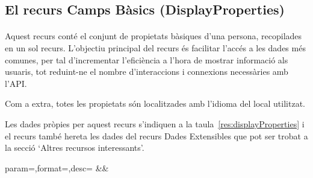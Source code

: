 \subsection{El recurs Camps Bàsics (DisplayProperties)}

    \paragraph{}
    Aquest recurs conté el conjunt de propietats bàsiques d'una persona, recopilades en un sol recurs. L'objectiu principal del recurs és facilitar l'accés a les dades més comunes, per tal d'incrementar l'eficiència a l'hora de mostrar informació als usuaris, tot reduint-ne el nombre d'interaccions i connexions necessàries amb l'API.

    Com a extra, totes les propietats són localitzades amb l'idioma del local utilitzat.

    Les dades pròpies per aquest recurs s'indiquen a la taula~\ref{res:displayProperties} i el recurs també hereta les dades del recurs Dades Extensibles que pot ser trobat a la secció `Altres recursos interessants'.

    \begin{center}
             {param=\param,format=\format,desc=\desc}
             {\param&\format&\desc}
     \end{center}
